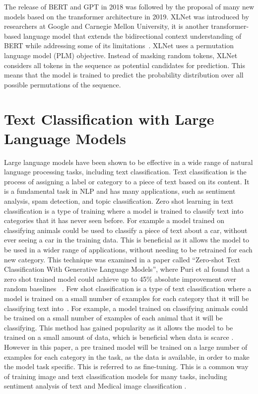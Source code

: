 \documentclass{UoYCSproject}
\begin{document}
    The release of BERT and GPT in 2018 was followed by the proposal of many new models based on the transformer architecture in 2019.
    XLNet was introduced by researchers at Google and Carnegie Mellon University, it is another transformer-based language model that extends the bidirectional context understanding of BERT while addressing some of its limitations~\cite{yang2020xlnet}.
    XLNet uses a permutation language model (PLM) objective.
    Instead of masking random tokens, XLNet considers all tokens in the sequence as potential candidates for prediction.
    This means that the model is trained to predict the probability distribution over all possible permutations of the sequence. \par

    \section{Text Classification with Large Language Models}
    \label{sec:text-classification}
    Large language models have been shown to be effective in a wide range of natural language processing tasks, including text classification.
    Text classification is the process of assigning a label or category to a piece of text based on its content.
    It is a fundamental task in NLP and has many applications, such as sentiment analysis, spam detection, and topic classification.
    Zero shot learning in text classification is a type of training where a model is trained to classify text into categories that it has never seen before\cite{zeroshot}.
    For example a model trained on classifying animals could be used to classify a piece of text about a car, without ever seeing a car in the training data.
    This is beneficial as it allows the model to be used in a wider range of applications, without needing to be retrained for each new category.
    This technique was examined in a paper called ``Zero-shot Text Classification With Generative Language Models'', where Puri et al found that a zero shot trained model could achieve up to 45\% absolute improvement over random baselines ~\cite{puri2019zeroshot}.
    Few shot classification is a type of text classification where a model is trained on a small number of examples for each category that it will be classifying text into~\cite{luo2023closer}.
    For example, a model trained on classifying animals could be trained on a small number of examples of each animal that it will be classifying.
This method has gained popularity as it allows the model to be trained on a small amount of data, which is beneficial when data is scarce \cite{luo2023closer}.
    However in this paper, a pre trained model will be trained on a large number of examples for each category in the task, as the data is available, in order to make the model task specific.
    This is referred to as fine-tuning.
    This is a common way of training image and text classification models for many tasks, including sentiment analysis of text and Medical image classification \cite{SentAnalysis, medFineTuning}.
\par
\end{document}
